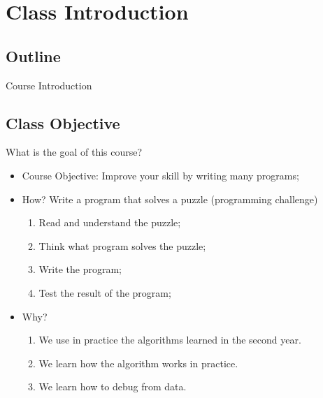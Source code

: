 
\section{Class Introduction}
\subsection{Outline}

\begin{frame}
  \centering
  {\huge
    Course Introduction
  }
\end{frame}


\subsection{Class Objective}
\begin{frame}{What is the goal of this course?}
  \begin{itemize}
    \item \alert{Course Objective}: Improve your skill by writing many programs;
    \bigskip

    \item \alert{How?} Write a program that solves a puzzle (programming challenge)
      \medskip
    \begin{enumerate}
      \item Read and understand the puzzle;
      \item Think what program solves the puzzle;
      \item Write the program;
      \item Test the result of the program;
    \end{enumerate}
    \medskip

    \item \alert{Why?} 
    \begin{enumerate}
      \item We use in practice the algorithms learned in the second year.
      \item We learn how the algorithm works in practice.
      \item We learn how to debug from data.
    \end{enumerate}

  \end{itemize}
\end{frame}

